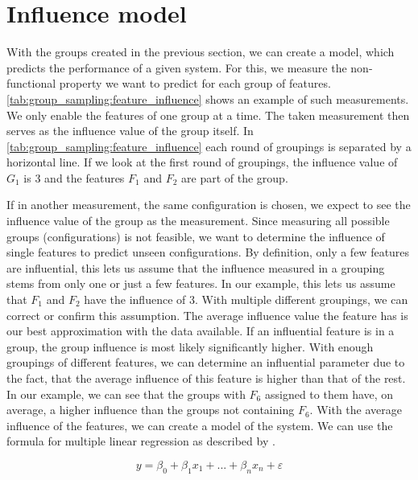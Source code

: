 \documentclass[../../thesis.tex]{subfiles}
\begin{document}
\section{Influence model}\label{sec:group_sampling:influence_model}

With the groups created in the previous section, we can create a model,
which predicts the performance of a given system.
For this, we measure the non-functional property we want to predict for each group of features.
\autoref{tab:group_sampling:feature_influence} shows an example of such measurements.
We only enable the features of one group at a time. The taken measurement then serves
as the influence value of the group itself. In \autoref{tab:group_sampling:feature_influence}
each round of groupings is separated by a horizontal line. If we look at the first round of
groupings, the influence value of $G_1$ is 3 and the features $F_1$ and $F_2$ are part of the group.

If in another measurement, the same configuration is chosen, we expect to see the influence value
of the group as the measurement. Since measuring all possible groups (configurations) is not
feasible, we want to determine the influence of single features to predict unseen configurations.
By definition, only a few features are influential, this lets us assume that the influence measured
in a grouping stems from only one or just a few features. In our example, this lets us assume that $F_1$
and $F_2$ have the influence of 3. With multiple different groupings, we can
correct or confirm this assumption. The average influence value the feature has is our
best approximation with the data available. If an influential feature is in a group,
the group influence is most likely significantly higher. With enough groupings of different
features, we can determine an influential parameter due to the fact, that the average
influence of this feature is higher than that of the rest. In our example, we can see that
the groups with $F_6$ assigned to them have, on average, a higher influence than the groups
not containing $F_6$. With the average influence of the features, we can create a model of the system.
We can use the formula for multiple linear regression as described by \citet{uyanik2013multiplelinear}.

\begin{equation}
    y=\beta_0 + \beta_1 x_1 + ... + \beta_n x_n + \varepsilon
\end{equation}
\end{document}
